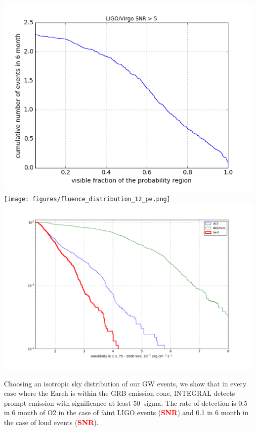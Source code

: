 \documentclass[a0,portrait]{a0poster}
\newcommand{\vs}[1] {\textbf{\textcolor{red}{#1}}}
\begin{document}
\begin{multicols}{2}
\begin{center}\vspace{.5cm}
    \includegraphics[scale=.6]{figures/covered_region.png}\texttt{[image: figures/fluence\_distribution\_12\_pe.png]}\includegraphics[scale=.37]{figures/sensitivity_distribution_pe.png}
    \label{covered_region}
\end{center}

Choosing an isotropic sky distribution of our GW events, we show that
in every case where the Earch is within the GRB emission cone,
INTEGRAL detects prompt emission with significance at least 50~sigma.
The rate of detection is 0.5 in 6 month of O2 in the case of faint
LIGO events (\vs{SNR}) and 0.1 in 6 month in the case of loud events
(\vs{SNR}).


\end{multicols}
\end{document}

